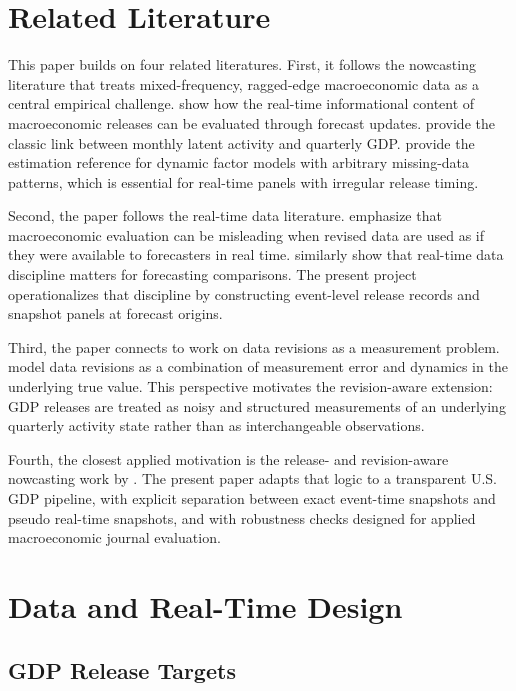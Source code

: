 \documentclass[12pt]{article}
\begin{document}
\section{Related Literature}
\label{sec:literature}

This paper builds on four related literatures. First, it follows the nowcasting literature that treats mixed-frequency, ragged-edge macroeconomic data as a central empirical challenge. \citet{giannone2008} show how the real-time informational content of macroeconomic releases can be evaluated through forecast updates. \citet{mariano2003} provide the classic link between monthly latent activity and quarterly GDP. \citet{banbura2014} provide the estimation reference for dynamic factor models with arbitrary missing-data patterns, which is essential for real-time panels with irregular release timing.

Second, the paper follows the real-time data literature. \citet{croushore2001,croushore2003} emphasize that macroeconomic evaluation can be misleading when revised data are used as if they were available to forecasters in real time. \citet{koenig2003} similarly show that real-time data discipline matters for forecasting comparisons. The present project operationalizes that discipline by constructing event-level release records and snapshot panels at forecast origins.

Third, the paper connects to work on data revisions as a measurement problem. \citet{jacobs2011} model data revisions as a combination of measurement error and dynamics in the underlying true value. This perspective motivates the revision-aware extension: GDP releases are treated as noisy and structured measurements of an underlying quarterly activity state rather than as interchangeable observations.

Fourth, the closest applied motivation is the release- and revision-aware nowcasting work by \citet{anesti2022}. The present paper adapts that logic to a transparent U.S. GDP pipeline, with explicit separation between exact event-time snapshots and pseudo real-time snapshots, and with robustness checks designed for applied macroeconomic journal evaluation.

\section{Data and Real-Time Design}
\label{sec:data}

\subsection{GDP Release Targets}
\end{document}
